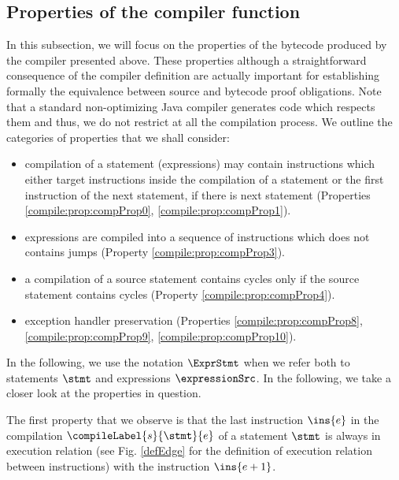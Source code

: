 \subsection{Properties of the compiler function}\label{compile:prop}
In this subsection, we will focus on the properties of the  bytecode produced by the compiler presented above.
These properties although a straightforward consequence of the compiler definition
 are actually important for establishing formally the equivalence between source and bytecode 
proof obligations. Note that a standard non-optimizing Java compiler generates code which respects them and thus, we
do not restrict at all the compilation process.  We outline the categories of properties that we shall consider:
\begin{itemize}
     
     \item compilation of a statement (expressions) may contain instructions which either target instructions inside the compilation of a statement or  the 
           first instruction of the next statement, if there is next statement (Properties \ref{compile:prop:compProp0}, \ref{compile:prop:compProp1}).
     
     \item expressions are compiled into a sequence of instructions which does not contains jumps (Property \ref{compile:prop:compProp3}).
     

     \item a compilation of a source statement contains cycles only if the source statement contains cycles (Property \ref{compile:prop:compProp4}).
     
     \item exception handler preservation (Properties \ref{compile:prop:compProp8}, \ref{compile:prop:compProp9},  \ref{compile:prop:compProp10}).
     
\end{itemize}




In the following, we use the notation $\ExprStmt$ when we refer both to statements $\stmt$ and expressions $\expressionSrc$.
In the following, we take a closer look at the properties in question.
 
 The first property that we observe is that the last instruction $\ins{e}$ in the compilation
 $\compileLabel{s}{\stmt}{e}$  of a statement $\stmt$ is always in execution relation
 (see Fig. \ref{defEdge} for the definition of execution relation between instructions) with the
 instruction $\ins{e + 1}$.

